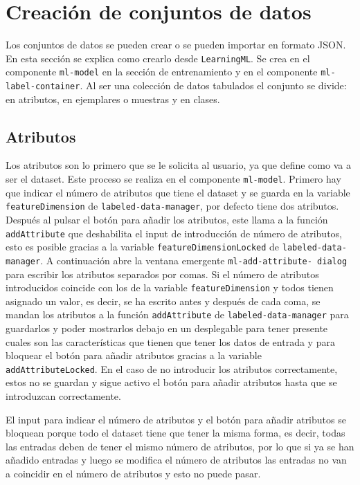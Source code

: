 \documentclass[a4paper, 12pt]{book}
\begin{document}
\section{Creación de conjuntos de datos} 
\label{sec:crear conjunto de datos}

Los conjuntos de datos se pueden crear o se pueden importar en formato JSON. En esta sección se explica como crearlo desde \texttt{LearningML}. 
Se crea en el componente \texttt{ml-model} en la sección de entrenamiento y en el componente \texttt{ml-label-container}. 
Al ser una colección de datos tabulados el conjunto se divide: en atributos, en ejemplares o muestras y en clases. 

\subsection{Atributos}
\label{subsec:atributos}

Los atributos son lo primero que se le solicita al usuario, ya que define como va a ser el dataset. 
Este proceso se realiza en el componente \texttt{ml-model}. 
Primero hay que indicar el número de atributos que tiene el dataset y se guarda en la variable \texttt{featureDimension} de \texttt{labeled-data-manager}, por defecto tiene dos atributos. 
Después al pulsar el botón para añadir los atributos, este llama a la función \texttt{addAttribute} que deshabilita el input de introducción de número de atributos, esto es posible gracias a la variable \texttt{featureDimensionLocked} de \texttt{labeled-data-manager}.
A continuación abre la ventana emergente \texttt{ml-add-attribute-
dialog} para escribir los atributos separados por comas. 
Si el número de atributos introducidos coincide con los de la variable \texttt{featureDimension} y todos tienen asignado un valor, es decir, se ha escrito antes y después de cada coma, se mandan los atributos a la función \texttt{addAttribute} de \texttt{labeled-data-manager} para guardarlos y poder mostrarlos debajo en un desplegable para tener presente cuales son las características que tienen que tener los datos de entrada y para bloquear el botón para añadir atributos gracias a la variable \texttt{addAttributeLocked}. 
En el caso de no introducir los atributos correctamente, estos no se guardan y sigue activo el botón para añadir atributos hasta que se introduzcan correctamente.

El input para indicar el número de atributos y el botón para añadir atributos se bloquean porque todo el dataset tiene que tener la misma forma, es decir, todas las entradas deben de tener el mismo número de atributos, por lo que si ya se han añadido entradas y luego se modifica el número de atributos las entradas no van a coincidir en el número de atributos y esto no puede pasar.
\end{document}
